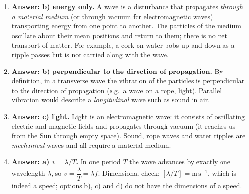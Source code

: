 \documentclass[11pt]{article}
\newcommand{\cle}[1]{{\popxbold\color{popdark}#1}}
\begin{document}
\begin{corrige}
\begin{enumerate}
\item \textbf{Answer: b) energy only.} A wave is a disturbance that propagates \emph{through a material medium} (or through vacuum for electromagnetic waves) transporting \cle{energy} from one point to another. The particles of the medium oscillate about their mean positions and return to them; there is no net transport of matter. For example, a cork on water bobs up and down as a ripple passes but is not carried along with the wave.
\item \textbf{Answer: b) perpendicular to the direction of propagation.} By definition, in a \cle{transverse} wave the vibration of the particles is perpendicular to the direction of propagation (e.g.\ a wave on a rope, light). Parallel vibration would describe a \emph{longitudinal} wave such as sound in air.
\item \textbf{Answer: c) light.} Light is an \cle{electromagnetic wave}: it consists of oscillating electric and magnetic fields and propagates through vacuum (it reaches us from the Sun through empty space). Sound, rope waves and water ripples are \emph{mechanical} waves and all require a material medium.
\item \textbf{Answer: a) $v = \lambda/T$.} In one period $T$ the wave advances by exactly one wavelength $\lambda$, so $v = \dfrac{\lambda}{T} = \lambda f$. Dimensional check: $[\lambda/T] = \mathrm{m\,s^{-1}}$, which is indeed a speed; options b), c) and d) do not have the dimensions of a speed.
\end{enumerate}
\end{corrige}
\end{document}
